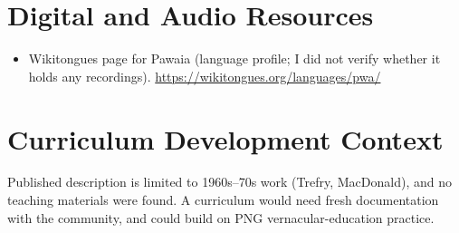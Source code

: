 \documentclass[12pt]{article}
\begin{document}
\section{Digital and Audio Resources}
\begin{itemize}
\item Wikitongues page for Pawaia (language profile; I did not verify whether it holds any recordings). \url{https://wikitongues.org/languages/pwa/}
\end{itemize}

\section{Curriculum Development Context}
Published description is limited to 1960s--70s work (Trefry, MacDonald), and no teaching materials were found. A curriculum would need fresh documentation with the community, and could build on PNG vernacular-education practice.
\end{document}
